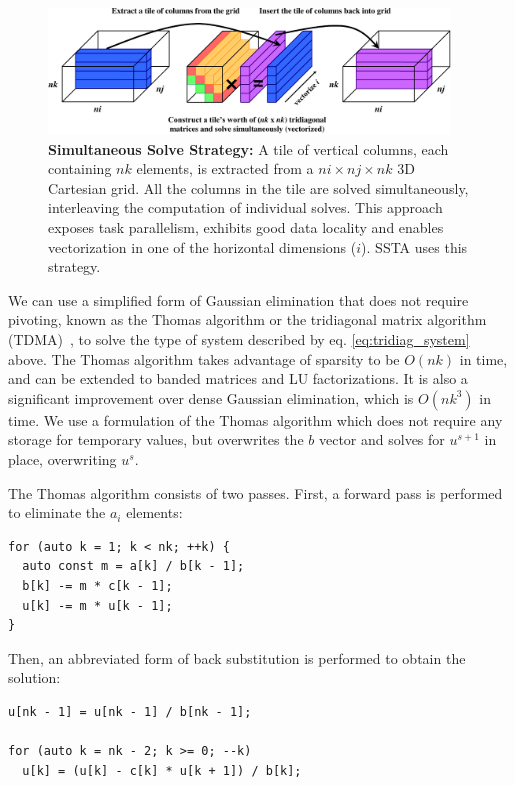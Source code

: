 \documentclass[10pt, conference, compsocconf]{IEEEtran}
\begin{document}
\begin{figure}[!bth]
  \centering
  \caption{\small
    \textbf{Simultaneous Solve Strategy:} A tile of vertical columns, each 
      containing \(nk\) elements, is extracted from a \(ni \times nj \times nk\)
      3D Cartesian grid.
    All the columns in the tile are solved simultaneously, interleaving 
      the computation of individual solves.
    This approach exposes task parallelism, exhibits good data locality and
      enables vectorization in one of the horizontal dimensions (\(i\)).
    SSTA uses this strategy.
  }
  \label{fig:impl:batching:sim_strat}
  \includegraphics[width=0.95\textwidth]{figures/batching/simultaneous_solve_diagram.pdf}
  \vspace{-4mm}
\end{figure}

We can use a simplified form of Gaussian elimination that does not require
  pivoting, known as the Thomas algorithm or the tridiagonal matrix algorithm
  (TDMA)~\cite{elem_numerical_analysis_conte}, to
  solve the type of system described by eq. \ref{eq:tridiag_system} above.
The Thomas algorithm takes advantage of sparsity to be \(O(nk)\) in time, 
  and can be extended to banded matrices and LU factorizations.
It is also a significant improvement over dense Gaussian elimination,
  which is \(O(nk^3)\) in time. 
We use a formulation of the Thomas algorithm which does not require any storage
  for temporary values, but overwrites the \(b\) vector and solves for
  \(u^{s+1}\) in place, overwriting \(u^{s}\).

The Thomas algorithm consists of two passes.  First, a forward pass is
  performed to eliminate the \(a_i\) elements:
\begin{lstlisting}
for (auto k = 1; k < nk; ++k) {
  auto const m = a[k] / b[k - 1];
  b[k] -= m * c[k - 1];
  u[k] -= m * u[k - 1];
} 
\end{lstlisting}
Then, an abbreviated form of back substitution is performed to obtain the
  solution:
\begin{lstlisting}
u[nk - 1] = u[nk - 1] / b[nk - 1];

for (auto k = nk - 2; k >= 0; --k) 
  u[k] = (u[k] - c[k] * u[k + 1]) / b[k];
\end{lstlisting}
\end{document}
